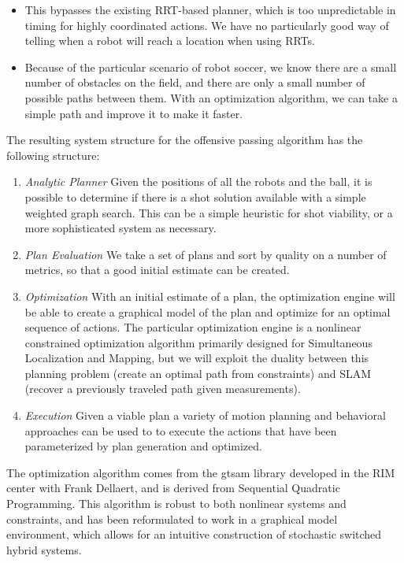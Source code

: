 \documentclass[a4paper, 10pt, conference]{ieeeconf}      %
\begin{document}
\begin{itemize}
 \item This bypasses the existing RRT-based planner, which is too unpredictable in timing for highly coordinated actions. We have no particularly good way of telling when a robot will reach a location when using RRTs.
 \item Because of the particular scenario of robot soccer, we know there are a small number of obstacles on the field, and there are only a small number of possible paths between them. With an optimization algorithm, we can take a simple path and improve it to make it faster.
\end{itemize}

The resulting system structure for the offensive passing algorithm has the following structure:
\begin{enumerate}
 \item \textit{Analytic Planner} Given the positions of all the robots and the ball, it is possible to determine if there is a shot solution available with a simple weighted graph search. This can be a simple heuristic for shot viability, or a more sophisticated system as necessary.
 \item \textit{Plan Evaluation} We take a set of plans and sort by quality on a number of metrics, so that a good initial estimate can be created.
 \item \textit{Optimization} With an initial estimate of a plan, the optimization engine will be able to create a graphical model of the plan and optimize for an optimal sequence of actions. The particular optimization engine is a nonlinear constrained optimization algorithm primarily designed for Simultaneous Localization and Mapping, but we will exploit the duality between this planning problem (create an optimal path from constraints) and SLAM (recover a previously traveled path given measurements).
 \item \textit{Execution} Given a viable plan a variety of motion planning and behavioral approaches can be used to to execute the actions that have been parameterized by plan generation and optimized.  
\end{enumerate}

The optimization algorithm comes from the gtsam library\cite{Dellaert05rss} developed in the RIM center with Frank Dellaert, and is derived from Sequential Quadratic Programming. This algorithm is robust to both nonlinear systems and constraints, and has been reformulated to work in a graphical model environment, which allows for an intuitive construction of stochastic switched hybrid systems.
\end{document}

